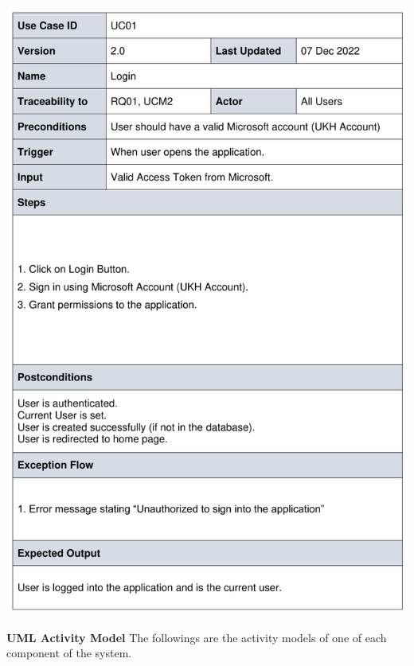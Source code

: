 \begin{minipage}[trim]{1\textwidth}
    \includegraphics[width=\textwidth]{endpages/appendices/appendix1/table-1.pdf}
\end{minipage}

\clearpage

\newendline\textbf{UML Activity Model}\newendline
The followings are the activity models of one of each component of the system.

